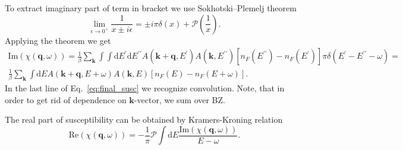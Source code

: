 \documentclass[preprint,prb,amsmath,superscriptaddress,showpacs]{revtex4}
\begin{document}
%
To extract imaginary part of term in bracket we use Sokhotski–Plemelj
theorem
%
\begin{equation}
\lim_{\epsilon \rightarrow 0^{+}} \frac{1}{x \pm i\epsilon} = \pm
i\pi\delta (x) + \mathcal{P}\left( \frac{1}{x} \right).
\end{equation}
%
Applying the theorem we get
%
\begin{equation}
    \begin{gathered}
 \mathrm{Im} (\chi(\mathbf{q}, \omega)) =  \frac{1}{\beta} \sum_{\mathbf{k}} \int \int
      \mathrm{d}E^{\prime} \mathrm{d}E^{\prime \prime} A(\mathbf{k} +
      \mathbf{q}, E^{\prime}) A(\mathbf{k}, E^{\prime \prime}) \left[
        n_F(E^{\prime \prime}) - n_F(E^{\prime}) \right] \pi
      \delta(E^{\prime} - E^{\prime \prime} - \omega) = \\
       \frac{1}{\beta} \sum_{\mathbf{k}} \int
      \mathrm{d}E A(\mathbf{k} +
      \mathbf{q}, E + \omega) A(\mathbf{k}, E) \left[
        n_F(E) - n_F(E + \omega) \right].
    \end{gathered}
    \label{eq:final_susc}
\end{equation}
%
In the last line of Eq.~\eqref{eq:final_susc} we recognize convolution. Note, that in order to get rid of dependence on $\mathbf{k}$-vector,
we sum over BZ.

The real part of susceptibility can be obtained by
Kramers-Kroning relation
%
\begin{equation}
\mathrm{Re} (\chi(\mathbf{q}, \omega)) = - \frac{1}{\pi} \mathcal{P} \int
\mathrm{d} E \frac{\mathrm{Im} (\chi(\mathbf{q}, \omega))}{E - \omega}.
\end{equation}
%

\iffalse
Using RPA approximation we can further write spectral function
$A(\mathbf{k}, E)$ as
%
\begin{equation}
A(\mathbf{k}, E) = - \frac{1}{\pi} \mathrm{Im} (G_{\mathrm{ret}}(\mathbf{k}, E)) =
\frac{1}{\pi} \frac{-\mathrm{Im}(\Sigma)}{\left( E -
    \varepsilon_{\mathbf{k}} + \mu - \mathrm{Re}(\Sigma) \right)^2 + (\mathrm{Im}(\Sigma))^2}.
\end{equation}
%
Here, $\Sigma$ marks RPA self-energy.
\fi
\end{document}

